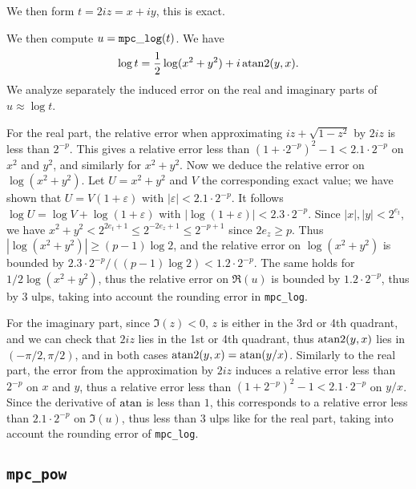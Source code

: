 \documentclass [11pt]{article}
\begin{document}
We then form $t = 2iz = x + iy$, this is exact.

We then compute $u = {\tt mpc\_log}(t)$.
We have
\[ \log t = \frac{1}{2} \log(x^2+y^2) + i \, {\rm atan2}(y,x). \]
We analyze separately the induced error on the real and imaginary parts
of $u \approx \log t$.

For the real part, the relative error when approximating
$iz + \sqrt{1-z^2}$ by $2iz$ is less than $2^{-p}$.
This gives a relative error less than $(1 + \cdot 2^{-p})^2 - 1 < 2.1 \cdot 2^{-p}$
on $x^2$ and $y^2$, and similarly for $x^2+y^2$.
Now we deduce the relative error on $\log(x^2+y^2)$.
Let $U = x^2+y^2$ and $V$ the corresponding exact value;
we have shown that $U = V (1 + \varepsilon)$ with
$|\varepsilon| < 2.1 \cdot 2^{-p}$.
It follows $\log U = \log V + \log(1 + \varepsilon)$
with $|\log(1 + \varepsilon)| < 2.3 \cdot 2^{-p}$.
Since $|x|, |y| < 2^{e_t}$, we have $x^2+y^2 < 2^{2e_t+1} \le 2^{-2e_z+1}
\le 2^{-p+1}$ since $2e_z \ge p$.
Thus $|\log(x^2+y^2)| \ge (p-1) \log 2$,
and the relative error on $\log(x^2+y^2)$ is bounded by
$2.3 \cdot 2^{-p}/((p-1) \log 2) < 1.2 \cdot 2^{-p}$.
The same holds for $1/2 \log(x^2+y^2)$, thus the relative error on $\Re(u)$
is bounded by $1.2 \cdot 2^{-p}$, thus by $3$ ulps, taking into account
the rounding error in \verb|mpc_log|.

For the imaginary part, since $\Im(z) < 0$, $z$ is either in the 3rd or 4th
quadrant, and we can check that $2iz$ lies in the 1st or 4th
quadrant, thus ${\rm atan2}(y,x)$ lies in $(-\pi/2,\pi/2)$, and in both
cases ${\rm atan2}(y,x) = {\rm atan}(y/x)$.
Similarly to the real part, the error from the approximation by $2iz$
induces a relative error less than $2^{-p}$ on $x$ and $y$,
thus a relative error less than $(1 + 2^{-p})^2-1 < 2.1 \cdot 2^{-p}$
on $y/x$.
Since the derivative of $\rm atan$ is less than $1$, this corresponds
to a relative error less than $2.1 \cdot 2^{-p}$ on $\Im(u)$,
thus less than $3$ ulps like for the real part,
taking into account the rounding error of \verb|mpc_log|.


\subsection {\texttt {mpc\_pow}}
\end{document}

